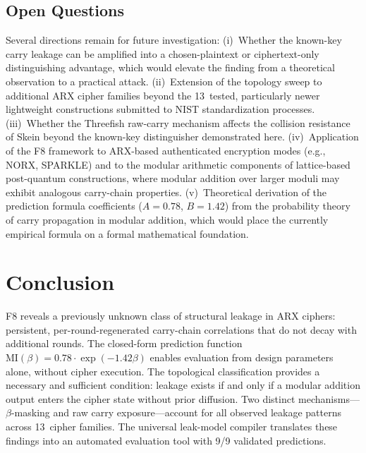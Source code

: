 \documentclass[conference,a4paper]{IEEEtran}
\begin{document}
\subsection{Open Questions}

Several directions remain for future investigation: (i)~Whether the known-key carry leakage can be amplified into a chosen-plaintext or ciphertext-only distinguishing advantage, which would elevate the finding from a theoretical observation to a practical attack. (ii)~Extension of the topology sweep to additional ARX cipher families beyond the 13~tested, particularly newer lightweight constructions submitted to NIST standardization processes. (iii)~Whether the Threefish raw-carry mechanism affects the collision resistance of Skein beyond the known-key distinguisher demonstrated here. (iv)~Application of the F8 framework to ARX-based authenticated encryption modes (e.g., NORX, SPARKLE) and to the modular arithmetic components of lattice-based post-quantum constructions, where modular addition over larger moduli may exhibit analogous carry-chain properties. (v)~Theoretical derivation of the prediction formula coefficients ($A = 0.78$, $B = 1.42$) from the probability theory of carry propagation in modular addition, which would place the currently empirical formula on a formal mathematical foundation.

\section{Conclusion}

F8 reveals a previously unknown class of structural leakage in ARX ciphers: persistent, per-round-regenerated carry-chain correlations that do not decay with additional rounds. The closed-form prediction function $\mathrm{MI}(\beta) = 0.78 \cdot \exp(-1.42\beta)$ enables evaluation from design parameters alone, without cipher execution. The topological classification provides a necessary and sufficient condition: leakage exists if and only if a modular addition output enters the cipher state without prior diffusion. Two distinct mechanisms---$\beta$-masking and raw carry exposure---account for all observed leakage patterns across 13~cipher families. The universal leak-model compiler translates these findings into an automated evaluation tool with 9/9 validated predictions.
\end{document}
